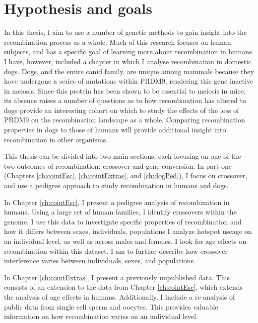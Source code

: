 \section{Hypothesis and goals}


In this thesis, I aim to use a number of genetic methods to gain insight into the recombination process as a whole.
Much of this research focuses on human subjects, and has a specific goal of learning more about recombination in humans.
I have, however, included a chapter in which I analyse recombination in domestic dogs.
Dogs, and the entire canid family, are unique among mammals because they have undergone a series of mutations within PRDM9, rendering this gene inactive in meiosis.
Since this protein has been shown to be essential to meiosis in mice, its absence raises a number of questions as to how recombination has altered to 
dogs provide an interesting cohort on which to study the effects of the loss of PRDM9 on the recombination landscape as a whole.
Comparing recombination properties in dogs to those of humans will provide additional insight into recombination in other organisms.

This thesis can be divided into two main sections, each focusing on one of the two outcomes of recombination: crossover and gene conversion.
In part one (Chapters \ref{ch:cointEsc}, \ref{ch:cointExtras}, and \ref{ch:dogPed}), I focus on crossover, and use a pedigree approach to study recombination in humans and dogs.

In Chapter \ref{ch:cointEsc}, I present a pedigree analysis of recombination in humans.
Using a large set of human families, I identify crossovers within the genome.
I use this data to investigate specific properties of recombination and how it differs between sexes, individuals, populations
I analyze hotspot useage on an individual level, as well as across males and females.
I look for age effects on recombination within this dataset.
I am to further describe how crossover interference varies between individuals, sexes, and populations.

In Chapter \ref{ch:cointExtras}, I present a previously unpublished data.
This consists of an extension to the data from Chapter \ref{ch:cointEsc}, which extends the analysis of age effects in humans.
Additionally, I include a re-analysis of public data from single cell sperm and oocytes.
This provides valuable information on how recombination varies on an individual level.


